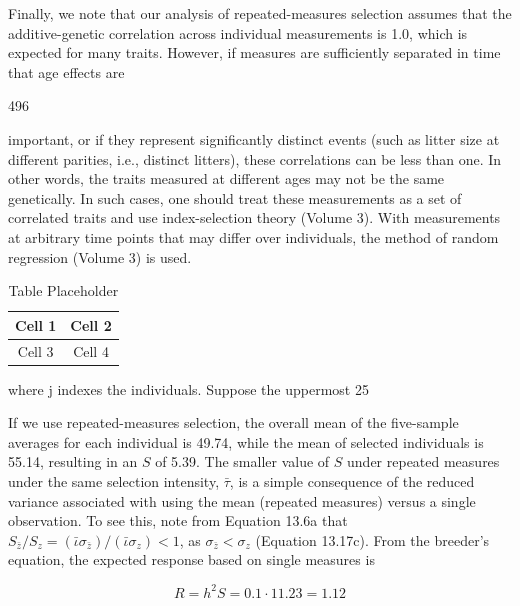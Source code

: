 \documentclass{article}
\begin{document}
Finally, we note that our analysis of repeated-measures selection assumes that the additive-genetic correlation across individual measurements is 1.0, which is expected for many traits. However, if measures are sufficiently separated in time that age effects are

496

important, or if they represent significantly distinct events (such as litter size at different parities, i.e., distinct litters), these correlations can be less than one. In other words, the traits measured at different ages may not be the same genetically. In such cases, one should treat these measurements as a set of correlated traits and use index-selection theory (Volume 3). With measurements at arbitrary time points that may differ over individuals, the method of random regression (Volume 3) is used.

\begin{table}[h]
\centering
\begin{tabular}{|c|c|}
\hline
Cell 1 & Cell 2 \\
\hline
Cell 3 & Cell 4 \\
\hline
\end{tabular}
\caption{Table Placeholder}
\end{table}

where j indexes the individuals. Suppose the uppermost 25%

If we use repeated-measures selection, the overall mean of the five-sample averages for each individual is 49.74, while the mean of selected individuals is 55.14, resulting in an $S$ of 5.39. The smaller value of $S$ under repeated measures under the same selection intensity, $\bar{\tau}$, is a simple consequence of the reduced variance associated with using the mean (repeated measures) versus a single observation. To see this, note from Equation 13.6a that $S_{\bar{z}}/S_z = (\bar{\iota}\sigma_{\bar{z}})/(\bar{\iota}\sigma_z) < 1$, as $\sigma_{\bar{z}} < \sigma_z$ (Equation 13.17c). From the breeder's equation, the expected response based on single measures is

\begin{equation}
R=h^{2}S=0.1\cdot11.23=1.12
\end{equation}
\end{document}
